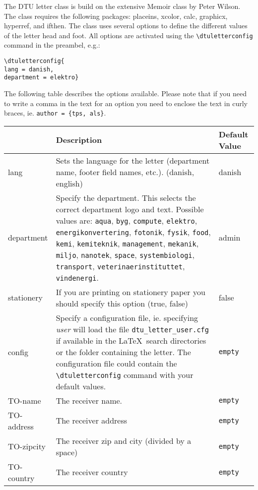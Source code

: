 \documentclass{dtuletter}
\newcommand{\optempty}{{\rmfamily\texttt{empty}}}
\begin{document}
The DTU letter class is build on the extensive Memoir class by Peter Wilson. The class requires the following packages: placeins, xcolor, calc, graphicx, hyperref, and ifthen. The class uses several options to define the different values of the letter head and foot. All options are activated using the \verb,\dtuletterconfig, command in the preambel, e.g.:

\begin{verbatim}
\dtuletterconfig{
lang = danish,
department = elektro} 
\end{verbatim}

The following table describes the options available. Please note that if you need to write a comma in the text for an option you need to enclose the text in curly braces, ie. \verb.author = {tps, als}..

\begin{longtable}{>{\ttfamily}l >{\raggedright}p{} >{\ttfamily}p{}}
\hline
{\normalfont Option} & Description & {\normalfont Default Value}\\ \hline
lang 		& Sets the language for the letter (department name, footer field names, etc.). (danish, english) & danish\\
department 	& Specify the department. This selects the correct department logo and text. Possible values are: \verb|aqua|, \verb|byg|, \verb|compute|, \verb|elektro|, \verb|energikonvertering|, \verb|fotonik|, \verb|fysik|, \verb|food|, \verb|kemi|, \verb|kemiteknik|, \verb|management|, \verb|mekanik|, \verb|miljo|, \verb|nanotek|, \verb|space|, \verb|systembiologi|, \verb|transport|, \verb|veterinaerinstituttet|, \verb|vindenergi|. & admin\\
stationery	& If you are printing on stationery paper you should specify this option (true, false) & false\\
config 		& Specify a configuration file, ie. specifying \emph{user} will load the file \verb,dtu_letter_user.cfg, if available in the \LaTeX\ search directories or the folder containing the letter. The configuration file could contain the \verb,\dtuletterconfig, command with your default values. & \optempty\\
TO-name 	& The receiver name. & \optempty\\
TO-address	& The receiver address & \optempty\\
TO-zipcity	& The receiver zip and city (divided by a space) & \optempty\\
TO-country	& The receiver country & \optempty\\

\end{longtable}
\end{document}
